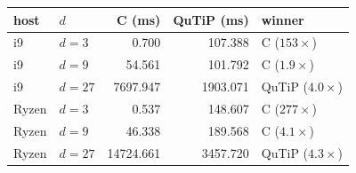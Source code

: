 \begin{tabular}{@{}llrrl@{}}
\toprule
host & $d$ & C (ms) & QuTiP (ms) & winner \\
\midrule
i9 & $d=3$ & 0.700 & 107.388 & C ($153\times$) \\
i9 & $d=9$ & 54.561 & 101.792 & C ($1.9\times$) \\
i9 & $d=27$ & 7697.947 & 1903.071 & QuTiP ($4.0\times$) \\
Ryzen & $d=3$ & 0.537 & 148.607 & C ($277\times$) \\
Ryzen & $d=9$ & 46.338 & 189.568 & C ($4.1\times$) \\
Ryzen & $d=27$ & 14724.661 & 3457.720 & QuTiP ($4.3\times$) \\
\bottomrule
\end{tabular}
